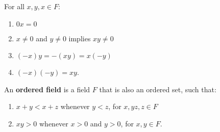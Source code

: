 \begin{proposition}\label{1.2.3}
    For all $x,y,x \in F$:
        \begin{enumerate}[label=(\arabic*)]
            \item $0x=0$

            \item  $x \neq 0$ and $y \neq 0$ implies $xy \neq 0$

            \item  $(-x)y=-(xy)=x(-y)$

            \item  $(-x)(-y)=xy$.
        \end{enumerate}
\end{proposition}

\begin{definition}
    An \textbf{ordered field} is a field $F$ that is also an ordered set, such that:
        \begin{enumerate}[label=(\arabic*)]
            \item $x+y<x+z$ whenever $y<z$, for  $x,yz,z \in F$

            \item $xy>0$ whenever  $x>0$ and  $y>0$, for  $x,y \in F$.
        \end{enumerate}
\end{definition}


